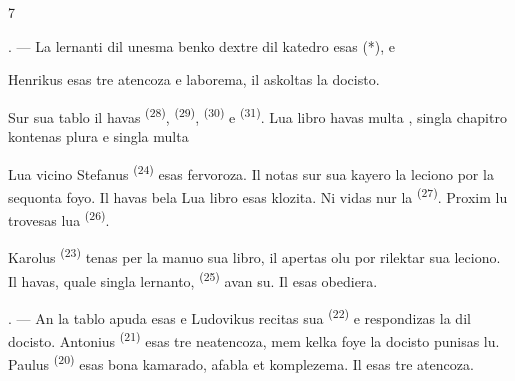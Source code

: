 \begin{VUpage}[9]{7}

\VUsaut{2.4mm}

\VUsaut{3.0mm}

. --- La lernanti dil unesma benko dextre\nl
dil katedro esas  (*),  e \cc
{}

\VUblancAlinea
Henrikus esas tre atencoza e laborema, il\nl
askoltas la docisto.

\VUblancAlinea
Sur sua tablo il havas  \textsuperscript{(28)},  \textsuperscript{(29)},\nl
{} \textsuperscript{(30)} e  \textsuperscript{(31)}. Lua libro havas\nl
multa , singla chapitro kontenas plura\nl
{} e singla  multa 

\VUblancAlinea
Lua vicino Stefanus \textsuperscript{(24)} esas fervoroza. Il\nl
notas sur sua kayero la leciono por la sequonta\nl
foyo. Il havas bela  Lua libro\nl
esas klozita. Ni vidas nur la  \textsuperscript{(27)}. Proxim\nl
lu trovesas lua  \textsuperscript{(26)}.

\VUblancAlinea
Karolus \textsuperscript{(23)} tenas per la manuo sua libro,\nl
il apertas olu por rilektar sua leciono. Il havas,\nl
quale singla lernanto,  \textsuperscript{(25)} avan su. Il\nl
esas obediera.

. --- An la tablo apuda esas \nl
{} e  Ludovikus recitas sua \cc
{} \textsuperscript{(22)} e respondizas la  dil docisto.\nl
Antonius \textsuperscript{(21)} esas tre neatencoza, mem kelka\cc
foye la docisto punisas lu. Paulus \textsuperscript{(20)} esas bona\nl
kamarado, afabla et komplezema. Il esas tre\nl
atencoza.
\end{VUpage}

